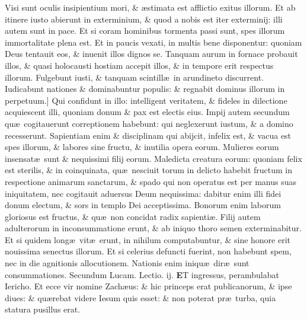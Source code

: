 \documentclass[a5paper,10pt]{book}
\def\leftmarginnote{%
	\lrmarginnote{\hskip -\marginparsep \hskip -6.5em}}
\def\ae{æ}
\begin{document}
\begin{multicols*}{2}
Visi sunt oculis insipientium mori, \& \ae stimata est afflictio exitus illorum. Et ab itinere iusto abierunt in exterminium, \& quod a nobis est iter exterminij: illi autem sunt in pace.%
Et si coram hominibus tormenta passi sunt, spes illorum immortalitate plena est. Et in paucis vexati, in multis bene disponentur:
quoniam Deus tentauit eos, \& inuenit illos dignos se.
Tanquam aurum in fornace probauit illos, \& quasi holocausti hostiam accepit illos, \& in tempore erit respectus illorum.
Fulgebunt iusti, \& tanquam scintill\ae \ in arundineto discurrent. Iudicabunt nationes \& dominabuntur populis: \& regnabit dominus illorum in perpetuum.]
Qui\leftmarginnote{\begin{flushright}B\end{flushright}} confidunt in illo: intelligent veritatem, \& fideles in dilectione acquiescent illi, quoniam donum \& pax est electis eius.
Impij autem secundum qu\ae \ cogitauerunt correptionem habebunt: qui neglexerunt iustum, \& a domino recesserunt.
Sapientiam enim \& disciplinam qui abijcit, infelix est, \& vacua est spes illorum, \& labores sine fructu, \& inutilia opera eorum.
Mulieres eorum insensat\ae \ sunt \& nequissimi filij eorum. Maledicta creatura eorum: quoniam felix est sterilis, \& in coinquinata, qu\ae \ nesciuit torum in delicto habebit fructum in respectione animarum sanctarum, \& spado qui non operatus est per manus suas iniquitatem, nec cogitauit aduersus Deum nequissima: dabitur enim illi fidei donum electum, \& sors in templo Dei acceptissima.
Bonorum enim laborum gloriosus est fructus, \& qu\ae \ non concidat radix sapienti\ae .
Filij autem adulterorum in inconsummatione erunt, \& ab iniquo thoro semen exterminabitur.
Et si quidem long\ae \ vit\ae \ erunt, in nihilum computabuntur, \& sine honore erit nouissima senectus illorum.
Et si celerius defuncti fuerint, non habebunt spem, nec in die agnitionis allocutionem. Nationis enim iniqu\ae \ dir\ae \ sunt consummationes.
\fancyhead[C]{\color{red} Feria. ij. Dominic\ae . iij. post aduentum}
\newline \color{red} Secundum Lucam. \hfill Lectio. ij. \color{black}
\vspace{-.25em}
\lettrine[lines=2]{\bfseries \color{red} E}{}\textdagger T\leftmarginnote{\begin{flushright}c. 19.\\a\end{flushright}} ingressus, perambulabat Iericho.
Et ecce vir nomine Zach\ae us: \& hic princeps erat publicanorum, \& ipse diues: \& qu\ae rebat videre Iesum quis esset: \& non poterat pr\ae \ turba, quia statura pusillus erat.

\end{multicols*}
\end{document}
